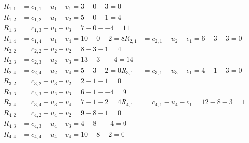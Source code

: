 \[
\begin{aligned}
R_{1,1} &= c_{1,1} - u_{1} - v_{1} = 3 - 0 - 3 = 0 \\
R_{1,2} &= c_{1,2} - u_{1} - v_{2} = 5 - 0 - 1 = 4 \\
R_{1,3} &= c_{1,3} - u_{1} - v_{3} = 7 - 0 - -4 = 11 \\
R_{1,4} &= c_{1,4} - u_{1} - v_{4} = 10 - 0 - 2 = 8 
R_{2,1} &= c_{2,1} - u_{2} - v_{1} = 6 - 3 - 3 = 0 \\
R_{2,2} &= c_{2,2} - u_{2} - v_{2} = 8 - 3 - 1 = 4 \\
R_{2,3} &= c_{2,3} - u_{2} - v_{3} = 13 - 3 - -4 = 14 \\
R_{2,4} &= c_{2,4} - u_{2} - v_{4} = 5 - 3 - 2 = 0 
R_{3,1} &= c_{3,1} - u_{3} - v_{1} = 4 - 1 - 3 = 0 \\
R_{3,2} &= c_{3,2} - u_{3} - v_{2} = 2 - 1 - 1 = 0 \\
R_{3,3} &= c_{3,3} - u_{3} - v_{3} = 6 - 1 - -4 = 9 \\
R_{3,4} &= c_{3,4} - u_{3} - v_{4} = 7 - 1 - 2 = 4 
R_{4,1} &= c_{4,1} - u_{4} - v_{1} = 12 - 8 - 3 = 1 \\
R_{4,2} &= c_{4,2} - u_{4} - v_{2} = 9 - 8 - 1 = 0 \\
R_{4,3} &= c_{4,3} - u_{4} - v_{3} = 4 - 8 - -4 = 0 \\
R_{4,4} &= c_{4,4} - u_{4} - v_{4} = 10 - 8 - 2 = 0 
\end{aligned}
\]

